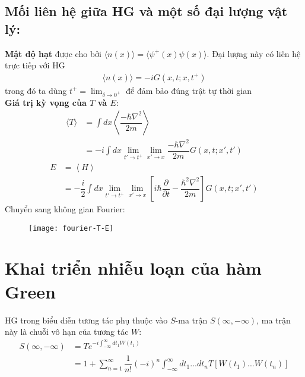 \documentclass{report}
\begin{document}
\subsection{Mối liên hệ giữa HG và một số đại lượng vật lý:}
\textbf{Mật độ hạt} được cho bởi $\langle n(x) \rangle = \langle \psi^{+}(x) \psi(x) \rangle$. Đại lượng này có liên hệ trực tiếp với HG
\begin{align}
	\langle n(x) \rangle = -iG(x,t;x,t^+)
\end{align}
trong đó ta dùng $t^+ = \displaystyle\lim_{\delta \rightarrow 0^+}$ để đảm bảo đúng trật tự thời gian\\
\textbf{Giá trị kỳ vọng của $T$ và $E$}:
\begin{align}
	\langle T \rangle & = \displaystyle \int dx \left\langle \dfrac{-\hbar \nabla^2}{2m} \right\rangle \nonumber                                                         \\
	                  & = -i \displaystyle \int dx \displaystyle\lim_{t' \rightarrow t^+} \displaystyle\lim_{x' \rightarrow x} \dfrac{-\hbar \nabla^2}{2m}  G(x,t;x',t')
\end{align}
\begin{align}
	E & = \left\langle H \right\rangle \nonumber                                                                                                                                                                        \\
	  & = -\dfrac{i}{2} \displaystyle \int dx \displaystyle\lim_{t' \rightarrow t^+} \displaystyle\lim_{x' \rightarrow x} \left[ i\hbar \dfrac{\partial}{\partial t} - \dfrac{\hbar ^2\nabla^2}{2m}\right] G(x,t;x',t')
\end{align}
\newpage
Chuyển sang không gian Fourier:

\begin{figure}[h]
	\centering
	\texttt{[image: fourier-T-E]}
	\label{fig:fourier-t-e}
\end{figure}


\newpage

\section{Khai triển nhiễu loạn của hàm Green}
HG trong biểu diễn tương tác phụ thuộc vào $S$-ma trận $S(\infty,-\infty)$, ma trận này là chuỗi vô hạn của tương tác $W$:
\begin{align}
	S(\infty,-\infty) & = T \displaystyle e^{-i\int_{-\infty}^{\infty}dt_1 W(t_1)}                                                                \\
	                  & = 1 + \sum_{n=1}^{\infty} \dfrac{1}{n!}(-i)^n \int_{-\infty}^{\infty}dt_1...dt_n T \left[W(t_1)...W(t_n)\right] \nonumber
\end{align}
\end{document}
